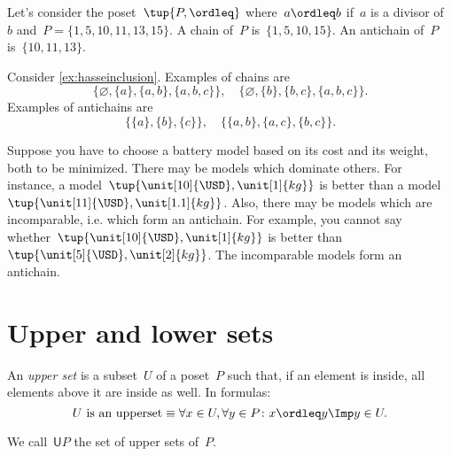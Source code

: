 \begin{example}
    Let's consider the poset~$\tup{P,\ordleq}$ where~$a\ordleq b$ if~$a$ is a divisor of~$b$ and~$P=\{1,5,10,11,13,15\}$. A chain of~$P$ is~$\{1,5,10,15\}$. An antichain of~$P$ is~$\{10,11,13\}$.
\end{example}

\begin{example}
    Consider \cref{ex:hasseinclusion}. Examples of chains are
    \begin{equation}
        \{\varnothing,\{a\},\{a,b\},\{a,b,c\}\}, \quad  \{\varnothing,\{b\},\{b,c\},\{a,b,c\}\}.
    \end{equation}
    Examples of antichains are
    \begin{equation}
        \{\{a\},\{b\},\{c\}\}, \quad \{ \{a,b\},\{a,c\}, \{b,c\}\}.
    \end{equation}
\end{example}

\begin{example}
    \label{ex:battery}
    Suppose you have to choose a battery model based on its cost and its weight, both to be minimized. There may be models which dominate others. For instance, a model~$\tup{\unit[10]{\USD},\unit[1]{kg}}$ is better than a model~$\tup{\unit[11]{\USD},\unit[1.1]{kg}}$. Also, there may be models which are incomparable, i.e. which form an antichain. For example, you cannot say whether~$\tup{\unit[10]{\USD},\unit[1]{kg}}$ is better than~$\tup{\unit[5]{\USD},\unit[2]{kg}}$. The incomparable models form an antichain.
\end{example}


\section{Upper and lower sets}

\begin{definition}
    \label{def:upperset}
    An \emph{upper set} is a subset~$U$ of a poset~$P$ such
    that, if an element is inside, all elements above it are inside as well.
    In formulas:
    \begin{equation}
        \text{$U$ is an upperset} \equiv \forall x\in U, \forall y\in P\colon x\ordleq y \Imp y\in U.
    \end{equation}
\end{definition}
\begin{remark}
    We call~$\mathsf{U}P$ the set of upper sets of~$P$.
\end{remark}


